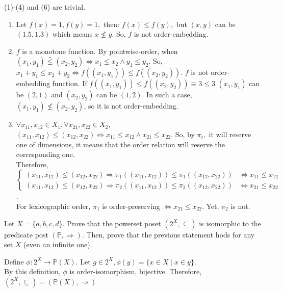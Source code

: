 \documentclass[11pt,a4paper]{exam}
\begin{document}
\begin{exo}
    \begin{sol}
        (1)-(4) and (6) are trivial.
        \begin{enumerate}
            \item Let $f(x) = 1, f(y) = 1,$ then: 
            $f(x) \leq f(y),$ but $(x,y)$ can be $(1.5, 1.3)$ which means $x \nleq y$. So, $f$ is not order-embedding.
            \item $f$ is a monotone function. By pointwise-order, when $(x_1,y_1) \overset{\centerdot}{\leq} (x_2, y_2) \Leftrightarrow x_1 \leq x_2 \land y_1 \leq y_2$. So, $x_1+y_1 \leq x_2+y_2 \Leftrightarrow f((x_1,y_1))\leq f((x_2,y_2))$. $f$ is not order-embedding function. If $f((x_1,y_1)) \leq f((x_2,y_2)) \equiv 3 \leq 3$ $(x_1, y_1)$ can be $(2,1)$ and $(x_2,y_2)$ can be $(1,2)$. In such a case, $(x_1, y_1) \nleq (x_2,y_2)$, so it is not order-embedding.
            \item $\forall x_{11}, x_{12} \in X_1, \forall x_{21}, x_{22} \in X_2$, $(x_{11},x_{12}) \leq (x_{12}, x_{22}) \Leftrightarrow x_{11} \leq x_{12} \land x_{21} \leq x_{22}$. So, by $\pi_i,$ it will reserve one of dimensions, it means that the order relation will reserve the corresponding one. \\
            Therefore, 
            $\begin{cases}
               (x_{11}, x_{12}) \leq (x_{12}, x_{22}) \Rightarrow \pi_1((x_{11},x_{12})) \leq \pi_1((x_{12},x_{22})) &\Leftrightarrow x_{11} \leq x_{12} \\
               (x_{11}, x_{12}) \leq (x_{12}, x_{22}) \Rightarrow \pi_2((x_{11},x_{12})) \leq \pi_2((x_{12},x_{22})) &\Leftrightarrow x_{21} \leq x_{22}
            \end{cases}$.\\
            For lexicographic order, $\pi_1$ is order-preserving $\Leftrightarrow x_{21} \leq x_{22}$. Yet, $\pi_2$ is not.
        \end{enumerate}        
    \end{sol}
\end{exo}

\begin{exo}
    Let $X = \{a,b,c,d\}$. Prove that the powerset poset $(2^X, \subseteq)$ is isomorphic to the predicate post $(\mathbb{P}, \Rightarrow)$. Then, prove that the previous statement hods for any set $X$ (even an infinite one).

    \begin{sol}
        Define $\phi \colon 2^X \rightarrow \mathbb{P}(X)$. Let $g \in 2^X, \phi(y) = \{x \in X \mid x \in y\}$.\\
        By this definition, $\phi$ is order-isomorphism, bijective. Therefore, $(2^X, \subseteq) \overset{~}{=} (\mathbb{P}(X), \Rightarrow)$ 
    \end{sol}
\end{exo}
\end{document}
